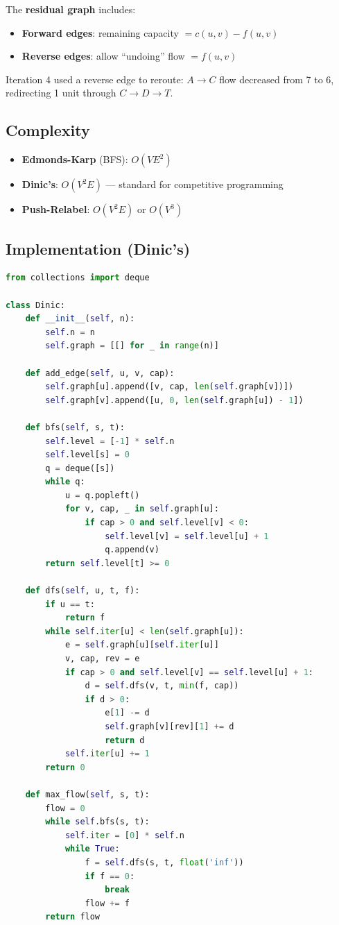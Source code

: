 The \textbf{residual graph} includes:
\begin{itemize}
\item \textbf{Forward edges}: remaining capacity $= c(u,v) - f(u,v)$
\item \textbf{Reverse edges}: allow ``undoing'' flow $= f(u,v)$
\end{itemize}

Iteration 4 used a reverse edge to reroute: $A \to C$ flow decreased from 7 to 6, redirecting 1 unit through $C \to D \to T$.

\subsection{Complexity}

\begin{itemize}
\item \textbf{Edmonds-Karp} (BFS): $O(VE^2)$
\item \textbf{Dinic's}: $O(V^2 E)$ --- standard for competitive programming
\item \textbf{Push-Relabel}: $O(V^2 E)$ or $O(V^3)$
\end{itemize}

\subsection{Implementation (Dinic's)}

\begin{lstlisting}[language=Python]
from collections import deque

class Dinic:
    def __init__(self, n):
        self.n = n
        self.graph = [[] for _ in range(n)]

    def add_edge(self, u, v, cap):
        self.graph[u].append([v, cap, len(self.graph[v])])
        self.graph[v].append([u, 0, len(self.graph[u]) - 1])

    def bfs(self, s, t):
        self.level = [-1] * self.n
        self.level[s] = 0
        q = deque([s])
        while q:
            u = q.popleft()
            for v, cap, _ in self.graph[u]:
                if cap > 0 and self.level[v] < 0:
                    self.level[v] = self.level[u] + 1
                    q.append(v)
        return self.level[t] >= 0

    def dfs(self, u, t, f):
        if u == t:
            return f
        while self.iter[u] < len(self.graph[u]):
            e = self.graph[u][self.iter[u]]
            v, cap, rev = e
            if cap > 0 and self.level[v] == self.level[u] + 1:
                d = self.dfs(v, t, min(f, cap))
                if d > 0:
                    e[1] -= d
                    self.graph[v][rev][1] += d
                    return d
            self.iter[u] += 1
        return 0

    def max_flow(self, s, t):
        flow = 0
        while self.bfs(s, t):
            self.iter = [0] * self.n
            while True:
                f = self.dfs(s, t, float('inf'))
                if f == 0:
                    break
                flow += f
        return flow
\end{lstlisting}
